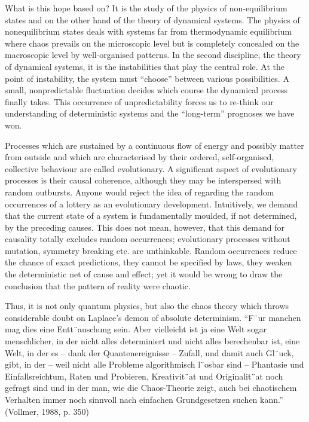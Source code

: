\documentclass[12pt]{article}
\begin{document}
\hfill

What is this hope based on? It is the study of the physics of non-equilibrium states
and on the other hand of the theory of dynamical systems. The physics of nonequilibrium
states deals with systems far from thermodynamic equilibrium where
chaos prevails on the microscopic level but is completely concealed on the macroscopic
level by well-organised patterns. In the second discipline, the theory of dynamical
systems, it is the instabilities that play the central role. At the point of
instability, the system must “choose” between various possibilities. A small, nonpredictable
fluctuation decides which course the dynamical process finally takes.
This occurrence of unpredictability forces us to re-think our understanding of deterministic
systems and the “long-term” prognoses we have won.

\hfill

Processes which are sustained by a continuous flow of energy and possibly matter
from outside and which are characterised by their ordered, self-organised, collective
behaviour are called evolutionary. A significant aspect of evolutionary processes is
their causal coherence, although they may be interspersed with random outbursts.
Anyone would reject the idea of regarding the random occurrences of a lottery as
an evolutionary development. Intuitively, we demand that the current state of a
system is fundamentally moulded, if not determined, by the preceding causes. This
does not mean, however, that this demand for causality totally excludes random
occurrences; evolutionary processes without mutation, symmetry breaking etc. are
unthinkable. Random occurrences reduce the chance of exact predictions, they cannot
be specified by laws, they weaken the deterministic net of cause and effect; yet
it would be wrong to draw the conclusion that the pattern of reality were chaotic.

\hfill

Thus, it is not only quantum physics, but also the chaos theory which throws considerable
doubt on Laplace’s demon of absolute determinism. “F¨ur manchen mag
dies eine Entt¨auschung sein. Aber vielleicht ist ja eine Welt sogar menschlicher, in
der nicht alles determiniert und nicht alles berechenbar ist, eine Welt, in der es –
dank der Quantenereignisse – Zufall, und damit auch Gl¨uck, gibt, in der – weil nicht
alle Probleme algorithmisch l¨osbar sind – Phantasie und Einfallsreichtum, Raten
und Probieren, Kreativit¨at und Originalit¨at noch gefragt sind und in der man, wie
die Chaos-Theorie zeigt, auch bei chaotischem Verhalten immer noch sinnvoll nach
einfachen Grundgesetzen suchen kann.” (Vollmer, 1988, p. 350)
\end{document}

